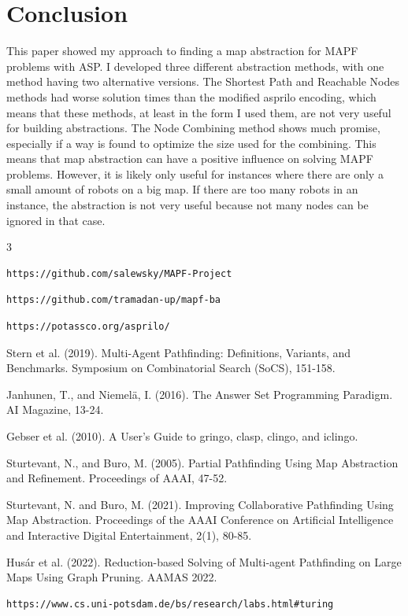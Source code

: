 \documentclass[runningheads]{llncs}
\begin{document}
\section{Conclusion}
This paper showed my approach to finding a map abstraction for MAPF problems with ASP. I developed three different abstraction methods, with one method having two alternative versions. The Shortest Path and Reachable Nodes methods had worse solution times than the modified asprilo encoding, which means that these methods, at least in the form I used them, are not very useful for building abstractions. The Node Combining method shows much promise, especially if a way is found to optimize the size used for the combining. This means that map abstraction can have a positive influence on solving MAPF problems. However, it is likely only useful for instances where there are only a small amount of robots on a big map. If there are too many robots in an instance, the abstraction is not very useful because not many nodes can be ignored in that case. 
\newpage

\begin{thebibliography} {3}
\begin{verbatim}
https://github.com/salewsky/MAPF-Project
\end{verbatim}

\begin{verbatim}
https://github.com/tramadan-up/mapf-ba
\end{verbatim}

\begin{verbatim}
https://potassco.org/asprilo/
\end{verbatim}

Stern et al. (2019). Multi-Agent Pathfinding: Definitions, Variants, and Benchmarks. Symposium on Combinatorial Search (SoCS), 151-158.

Janhunen, T., and Niemelä, I. (2016). The Answer Set Programming Paradigm. AI Magazine, 13-24.

Gebser et al. (2010). A User's Guide to gringo, clasp, clingo, and iclingo. 

Sturtevant, N., and Buro, M. (2005). Partial Pathfinding Using Map Abstraction and Refinement. Proceedings of AAAI, 47-52.

Sturtevant, N. and Buro, M. (2021). Improving Collaborative Pathfinding Using Map Abstraction. Proceedings of the AAAI Conference on Artificial Intelligence and Interactive Digital Entertainment, 2(1), 80-85.

Husár et al. (2022). Reduction-based Solving of Multi-agent Pathfinding on Large Maps Using Graph Pruning. AAMAS 2022.

\begin{verbatim}
https://www.cs.uni-potsdam.de/bs/research/labs.html#turing
\end{verbatim}

\end{thebibliography}
\end{document}
